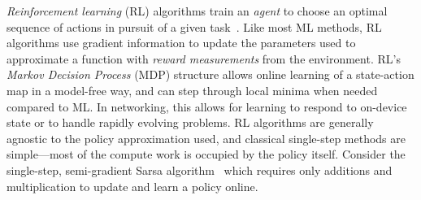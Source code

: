 \documentclass[
sigconf,natbib=false
]{acmart}
\newcommand{\acval}[3]{\ensuremath{\operatorname{\hat{q}}(#1, #2, #3)}}
\newcommand{\acvalblank}{\ensuremath{\operatorname{\hat{q}}(\cdot)}}
\newcommand{\wvec}[1]{\ensuremath{\bm{w}_{#1}}}
\begin{document}
\emph{Reinforcement learning} (RL) algorithms train an \emph{agent} to choose an optimal sequence of actions in pursuit of a given task~\parencite{RL2E}.
Like most ML methods, RL algorithms use gradient information to update the parameters used to approximate a function with \emph{reward measurements} from the environment.
RL's \emph{Markov Decision Process} (MDP) structure allows online learning of a state-action map in a model-free way, and can step through local minima when needed compared to ML.
In networking, this allows for learning to respond to on-device state or to handle rapidly evolving problems.
RL algorithms are generally agnostic to the policy approximation used, and classical single-step methods are simple---most of the compute work is occupied by the policy itself.
Consider the single-step, semi-gradient Sarsa algorithm~\cite[pp. \numrange{217}{221}]{RL2E} which requires only additions and multiplication to update and learn a policy online.

\end{document}
